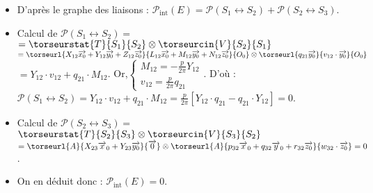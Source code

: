 \ifprof\begin{corrige}
\begin{itemize}
\item D'après le graphe des liaisons : $
\mathcal{P}_{\text{int}}(E)=\mathcal{P}(S_1 \leftrightarrow S_2)+\mathcal{P}(S_2 \leftrightarrow S_3)$.
\item Calcul de $\mathcal{P}(S_1 \leftrightarrow S_2)=$
$=\torseurstat{T}{S_1}{S_2}\otimes \torseurcin{V}{S_2}{S_1}$
$=\torseurl{X_{12}\overrightarrow{x_0}+Y_{12}\overrightarrow{y_0}+Z_{12}\overrightarrow{z_0}}{L_{12}\overrightarrow{x_0}+M_{12}\overrightarrow{y_0}+N_{12}\overrightarrow{z_0}}{O_0}
\otimes
\torseurl{q_{21}\overrightarrow{y_0}}{v_{12}\cdot \overrightarrow{y_0}}{O_0}$
$=Y_{12}\cdot v_{12}+q_{21}\cdot M_{12}$.
Or,$
\left\{
\begin{array}{c}
M_{12}=-\frac{p}{2\pi}Y_{12}\\
v_{12}=\frac{p}{2\pi}q_{21}
\end{array}
\right.
$. 
D'où : 
$
\mathcal{P}(S_1 \leftrightarrow S_2)
=Y_{12}\cdot v_{12}+q_{21}\cdot M_{12}=\frac{p}{2\pi}\left[Y_{12}\cdot q_{21}-q_{21}\cdot Y_{12}\right]=0
$.

\item Calcul de $\mathcal{P}(S_2 \leftrightarrow S_3)=$
$
\torseurstat{T}{S_2}{S_3}\otimes \torseurcin{V}{S_3}{S_2}$
$=\torseurl{A}{X_{23}\overrightarrow{x}_0+Y_{23}\overrightarrow{y_0}}{\overrightarrow{0}}
\otimes
\torseurl{A}{p_{32}\overrightarrow{x}_0+q_{32}\overrightarrow{y}_0+r_{32}\overrightarrow{z_0}}{w_{32}\cdot \overrightarrow{z_0}}\\
=0$.

\item On en déduit donc : 
$
\mathcal{P}_{\text{int}}(E)=0$.
\end{itemize}

\end{corrige}\else\fi



